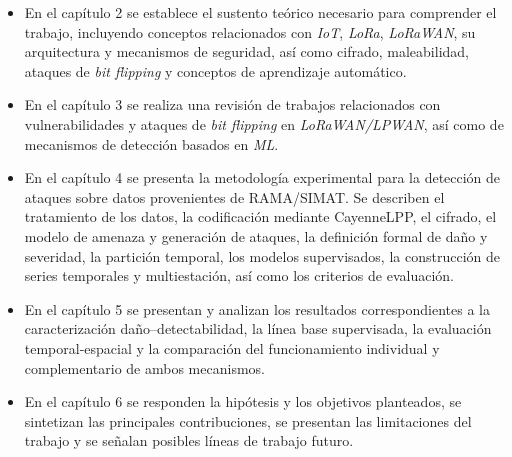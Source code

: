 \begin{itemize}

    \item[$\bullet$] En el capítulo 2 se establece el sustento teórico necesario para comprender el trabajo, incluyendo conceptos relacionados con \textit{IoT}, \textit{LoRa}, \textit{LoRaWAN}, su arquitectura y mecanismos de seguridad, así como cifrado, maleabilidad, ataques de \textit{bit flipping} y conceptos de aprendizaje automático.

    \item[$\bullet$] En el capítulo 3 se realiza una revisión de trabajos relacionados con vulnerabilidades y ataques de \textit{bit flipping} en \textit{LoRaWAN/LPWAN}, así como de mecanismos de detección basados en \textit{ML}.

    \item[$\bullet$] En el capítulo 4 se presenta la metodología experimental para la detección de ataques sobre datos provenientes de RAMA/SIMAT. Se describen el tratamiento de los datos, la codificación mediante CayenneLPP, el cifrado, el modelo de amenaza y generación de ataques, la definición formal de daño y severidad, la partición temporal, los modelos supervisados, la construcción de series temporales y multiestación, así como los criterios de evaluación.

    \item[$\bullet$] En el capítulo 5 se presentan y analizan los resultados correspondientes a la caracterización daño--detectabilidad, la línea base supervisada, la evaluación temporal-espacial y la comparación del funcionamiento individual y complementario de ambos mecanismos.

    \item[$\bullet$] En el capítulo 6 se responden la hipótesis y los objetivos planteados, se sintetizan las principales contribuciones, se presentan las limitaciones del trabajo y se señalan posibles líneas de trabajo futuro.

\end{itemize}
